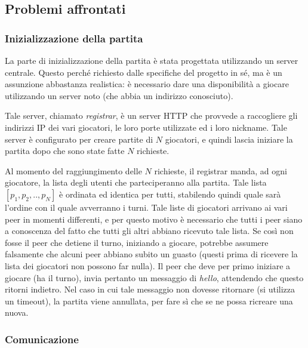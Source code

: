 \documentclass[10.5pt]{article}
\begin{document}
\subsection{Problemi affrontati}

\subsubsection{Inizializzazione della partita}

La parte di inizializzazione della partita è stata progettata utilizzando un server centrale. Questo perché richiesto dalle specifiche del progetto in sé, ma è un assunzione abbastanza realistica: è necessario dare una disponibilità a giocare utilizzando un server noto (che abbia un indirizzo conosciuto).

Tale server, chiamato \textit{registrar}, è un server HTTP che provvede a raccogliere gli indirizzi IP dei vari giocatori, le loro porte utilizzate ed i loro nickname. Tale server è configurato per creare partite di $N$ giocatori, e quindi lascia iniziare la partita dopo che sono state fatte $N$ richieste. 

Al momento del raggiungimento delle $N$ richieste, il registrar manda, ad ogni giocatore, la lista degli utenti che parteciperanno alla partita. Tale lista $[p_1, p_2, .., p_N]$ è ordinata ed identica per tutti, stabilendo quindi quale sarà l'ordine con il quale avverranno i turni. Tale liste di giocatori arrivano ai vari peer in momenti differenti, e per questo motivo è necessario che tutti i peer siano a conoscenza del fatto che tutti gli altri abbiano ricevuto tale lista. Se così non fosse il peer che detiene il turno, iniziando a giocare, potrebbe assumere falsamente che alcuni peer abbiano subito un guasto (questi prima di ricevere la lista dei giocatori non possono far nulla). Il peer che deve per primo iniziare a giocare (ha il turno), invia pertanto un messaggio di \textit{hello}, attendendo che questo ritorni indietro. Nel caso in cui tale messaggio non dovesse ritornare (si utilizza un timeout), la partita viene annullata, per fare sì che se ne possa ricreare una nuova. 

\subsubsection{Comunicazione}
\end{document}
